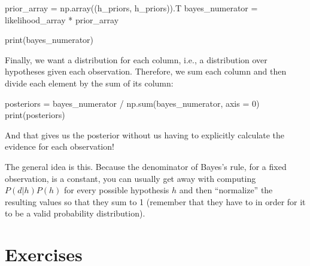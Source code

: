 \documentclass[
  letterpaper,
  DIV=11,
  numbers=noendperiod]{scrreprt}
\newenvironment{Shaded}{\begin{snugshade}}{\end{snugshade}}
\newcommand{\BuiltInTok}[1]{\textcolor[rgb]{0.00,0.23,0.31}{#1}}
\newcommand{\DecValTok}[1]{\textcolor[rgb]{0.68,0.00,0.00}{#1}}
\newcommand{\NormalTok}[1]{\textcolor[rgb]{0.00,0.23,0.31}{#1}}
\newcommand{\OperatorTok}[1]{\textcolor[rgb]{0.37,0.37,0.37}{#1}}
\begin{document}
\begin{Shaded}
\begin{Highlighting}[]
\NormalTok{prior\_array }\OperatorTok{=}\NormalTok{ np.array((h\_priors, h\_priors)).T}
\NormalTok{bayes\_numerator }\OperatorTok{=}\NormalTok{ likelihood\_array }\OperatorTok{*}\NormalTok{ prior\_array}

\BuiltInTok{print}\NormalTok{(bayes\_numerator)}
\end{Highlighting}
\end{Shaded}

Finally, we want a distribution for each column, i.e., a distribution
over hypotheses given each observation. Therefore, we sum each column
and then divide each element by the sum of its column:

\begin{Shaded}
\begin{Highlighting}[]
\NormalTok{posteriors }\OperatorTok{=}\NormalTok{ bayes\_numerator }\OperatorTok{/}\NormalTok{ np.}\BuiltInTok{sum}\NormalTok{(bayes\_numerator, axis }\OperatorTok{=} \DecValTok{0}\NormalTok{)}
\BuiltInTok{print}\NormalTok{(posteriors)}
\end{Highlighting}
\end{Shaded}

And that gives us the posterior without us having to explicitly
calculate the evidence for each observation!

\begin{tcolorbox}[enhanced jigsaw, opacitybacktitle=0.6, colback=white, title=\textcolor{quarto-callout-note-color}{\faInfo}\hspace{0.5em}{Note}, breakable, arc=.35mm, toptitle=1mm, rightrule=.15mm, toprule=.15mm, bottomtitle=1mm, coltitle=black, left=2mm, opacityback=0, colframe=quarto-callout-note-color-frame, leftrule=.75mm, bottomrule=.15mm, colbacktitle=quarto-callout-note-color!10!white, titlerule=0mm]

The general idea is this. Because the denominator of Bayes's rule, for a
fixed observation, is a constant, you can usually get away with
computing \(P(d|h) P(h)\) for every possible hypothesis \(h\) and then
``normalize'' the resulting values so that they sum to 1 (remember that
they have to in order for it to be a valid probability distribution).

\end{tcolorbox}

\section{Exercises 📝}\label{bayes-exercises}
\end{document}
